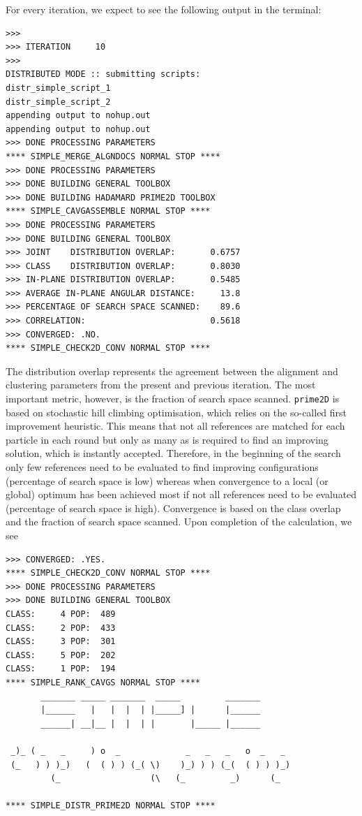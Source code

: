 \documentclass[a4paper,11pt]{article}
\newcommand{\prgname}[1]{\textcolor{NavyBlue}{\texttt{#1}}}
\begin{document}
For every iteration, we expect to see the following output in the terminal:
\begin{verbatim}
>>>
>>> ITERATION     10
>>>
DISTRIBUTED MODE :: submitting scripts:
distr_simple_script_1
distr_simple_script_2
appending output to nohup.out
appending output to nohup.out
>>> DONE PROCESSING PARAMETERS
**** SIMPLE_MERGE_ALGNDOCS NORMAL STOP ****
>>> DONE PROCESSING PARAMETERS
>>> DONE BUILDING GENERAL TOOLBOX
>>> DONE BUILDING HADAMARD PRIME2D TOOLBOX
**** SIMPLE_CAVGASSEMBLE NORMAL STOP ****
>>> DONE PROCESSING PARAMETERS
>>> DONE BUILDING GENERAL TOOLBOX
>>> JOINT    DISTRIBUTION OVERLAP:       0.6757
>>> CLASS    DISTRIBUTION OVERLAP:       0.8030
>>> IN-PLANE DISTRIBUTION OVERLAP:       0.5485
>>> AVERAGE IN-PLANE ANGULAR DISTANCE:     13.8
>>> PERCENTAGE OF SEARCH SPACE SCANNED:    89.6
>>> CORRELATION:                         0.5618
>>> CONVERGED: .NO.
**** SIMPLE_CHECK2D_CONV NORMAL STOP ****
\end{verbatim}
The distribution overlap represents the agreement between the alignment and clustering parameters from the present and previous iteration. The most important metric, however, is the fraction of search space scanned. \prgname{prime2D} is based on stochastic hill climbing optimisation, which relies on the so-called first improvement heuristic. This means that not all references are matched for each particle in each round but only as many as is required to find an improving solution, which is instantly accepted. Therefore, in the beginning of the search only few references need to be evaluated to find improving configurations (percentage of search space is low) whereas when convergence to a local (or global) optimum has been achieved most if not all references need to be evaluated (percentage of search space is high). Convergence is based on the class overlap and the fraction of search space scanned. Upon completion of the calculation, we see
\begin{verbatim}
>>> CONVERGED: .YES.
**** SIMPLE_CHECK2D_CONV NORMAL STOP ****
>>> DONE PROCESSING PARAMETERS
>>> DONE BUILDING GENERAL TOOLBOX
CLASS:     4 POP:  489
CLASS:     2 POP:  433
CLASS:     3 POP:  301
CLASS:     5 POP:  202
CLASS:     1 POP:  194
**** SIMPLE_RANK_CAVGS NORMAL STOP ****
       _______ _____ _______  _____         _______
       |______   |   |  |  | |_____] |      |______
       ______| __|__ |  |  | |       |_____ |______
 
 _)_ ( _   _     ) o  _             _   _   _   o  _   _
 (_   ) ) )_)   (  ( ) ) (_( \)    )_) ) ) (_(  ( ) ) )_)
         (_                  (\   (_         _)      (_

**** SIMPLE_DISTR_PRIME2D NORMAL STOP ****
\end{verbatim}
\end{document}
